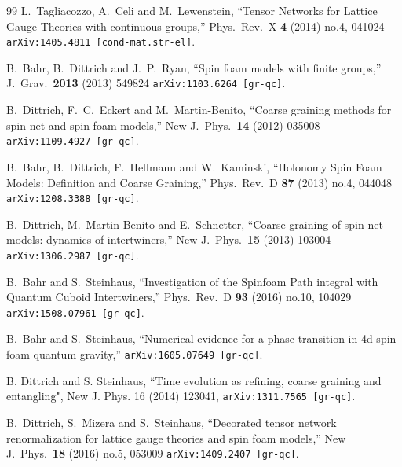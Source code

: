 \documentclass[nofootinbib,superscriptaddress,eqsecnum,tightenlines,11pt]{revtex4-1}
\begin{document}
\begin{thebibliography}{99}
L.~Tagliacozzo, A.~Celi and M.~Lewenstein,
  ``Tensor Networks for Lattice Gauge Theories with continuous groups,''
  Phys.\ Rev.\ X {\bf 4} (2014) no.4,  041024
  \texttt{arXiv:1405.4811 [cond-mat.str-el]}.

 B.~Bahr, B.~Dittrich and J.~P.~Ryan,
  ``Spin foam models with finite groups,''
  J.\ Grav.\  {\bf 2013} (2013) 549824
  \texttt{arXiv:1103.6264 [gr-qc]}.
  
  B.~Dittrich, F.~C.~Eckert and M.~Martin-Benito,
  ``Coarse graining methods for spin net and spin foam models,''
  New J.\ Phys.\  {\bf 14} (2012) 035008
  \texttt{arXiv:1109.4927 [gr-qc]}.


B.~Bahr, B.~Dittrich, F.~Hellmann and W.~Kaminski,
  ``Holonomy Spin Foam Models: Definition and Coarse Graining,''
  Phys.\ Rev.\ D {\bf 87} (2013) no.4,  044048
  \texttt{arXiv:1208.3388 [gr-qc]}.

 B.~Dittrich, M.~Martin-Benito and E.~Schnetter,
  ``Coarse graining of spin net models: dynamics of intertwiners,''
  New J.\ Phys.\  {\bf 15} (2013) 103004
  \texttt{arXiv:1306.2987 [gr-qc]}.


 B.~Bahr and S.~Steinhaus,
  ``Investigation of the Spinfoam Path integral with Quantum Cuboid Intertwiners,''
  Phys.\ Rev.\ D {\bf 93} (2016) no.10,  104029
  \texttt{arXiv:1508.07961 [gr-qc]}.

  B.~Bahr and S.~Steinhaus,
  ``Numerical evidence for a phase transition in 4d spin foam quantum gravity,''
  \texttt{arXiv:1605.07649 [gr-qc]}.

 B. Dittrich and S. Steinhaus,
``Time evolution as refining, coarse graining and entangling",
New J. Phys. 16 (2014) 123041, \texttt{arXiv:1311.7565 [gr-qc]}.

  B.~Dittrich, S.~Mizera and S.~Steinhaus,
  ``Decorated tensor network renormalization for lattice gauge theories and spin foam models,''
  New J.\ Phys.\  {\bf 18} (2016) no.5,  053009
  \texttt{arXiv:1409.2407 [gr-qc]}.
  



\end{thebibliography}
\end{document}
